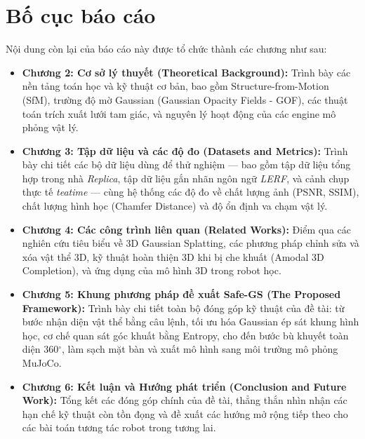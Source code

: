 \section{Bố cục báo cáo}
Nội dung còn lại của báo cáo này được tổ chức thành các chương như sau:

\begin{itemize}
    \item \textbf{Chương 2: Cơ sở lý thuyết (Theoretical Background):} Trình bày các nền tảng toán học và kỹ thuật cơ bản, bao gồm Structure-from-Motion (SfM), trường độ mờ Gaussian (Gaussian Opacity Fields - GOF), các thuật toán trích xuất lưới tam giác, và nguyên lý hoạt động của các engine mô phỏng vật lý.
    
    \item \textbf{Chương 3: Tập dữ liệu và các độ đo (Datasets and Metrics):} Trình bày chi tiết các bộ dữ liệu dùng để thử nghiệm — bao gồm tập dữ liệu tổng hợp trong nhà \textit{Replica}, tập dữ liệu gắn nhãn ngôn ngữ \textit{LERF}, và cảnh chụp thực tế \textit{teatime} — cùng hệ thống các độ đo về chất lượng ảnh (PSNR, SSIM), chất lượng hình học (Chamfer Distance) và độ ổn định va chạm vật lý.
    
    \item \textbf{Chương 4: Các công trình liên quan (Related Works):} Điểm qua các nghiên cứu tiêu biểu về 3D Gaussian Splatting, các phương pháp chỉnh sửa và xóa vật thể 3D, kỹ thuật hoàn thiện 3D khi bị che khuất (Amodal 3D Completion), và ứng dụng của mô hình 3D trong robot học.
    
    \item \textbf{Chương 5: Khung phương pháp đề xuất Safe-GS (The Proposed Framework):} Trình bày chi tiết toàn bộ đóng góp kỹ thuật của đề tài: từ bước nhận diện vật thể bằng câu lệnh, tối ưu hóa Gaussian ép sát khung hình học, cơ chế quan sát góc khuất bằng Entropy, cho đến bước bù khuyết toàn diện 360$^\circ$, làm sạch mặt bàn và xuất mô hình sang môi trường mô phỏng MuJoCo.
    
    \item \textbf{Chương 6: Kết luận và Hướng phát triển (Conclusion and Future Work):} Tổng kết các đóng góp chính của đề tài, thẳng thắn nhìn nhận các hạn chế kỹ thuật còn tồn đọng và đề xuất các hướng mở rộng tiếp theo cho các bài toán tương tác robot trong tương lai.
\end{itemize}

